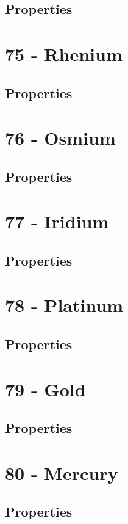 \documentclass{book}
\begin{document}
\subsection{Properties}

\section{75 - Rhenium}
\label{sec:elem-rhenium}
\subsection{Properties}

\section{76 - Osmium}
\label{sec:elem-osmium}
\subsection{Properties}

\section{77 - Iridium}
\label{sec:elem-iridium}
\subsection{Properties}

\section{78 - Platinum}
\label{sec:elem-platinum}
\subsection{Properties}

\section{79 - Gold}
\label{sec:elem-gold}
\subsection{Properties}

\section{80 - Mercury}
\label{sec:elem-mercury}
\subsection{Properties}
\end{document}
